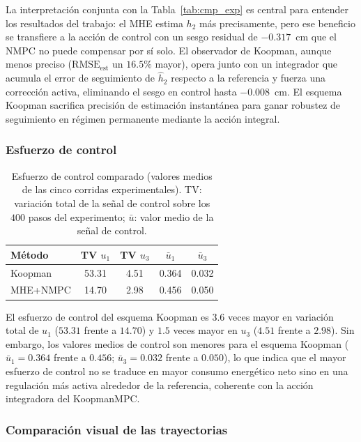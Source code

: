 \documentclass[12pt,letterpaper]{article}
\begin{document}
La interpretación conjunta con la Tabla~\ref{tab:cmp_exp} es
central para entender los resultados del trabajo: el MHE
estima $h_2$ más precisamente, pero ese beneficio se
transfiere a la acción de control con un sesgo residual de
$-0.317$~cm que el NMPC no puede compensar por sí solo. El
observador de Koopman, aunque menos preciso
($\mathrm{RMSE}_{\mathrm{est}}$ un $16.5\%$ mayor), opera
junto con un integrador que acumula el error de seguimiento
de $\hat{h}_2$ respecto a la referencia y fuerza una
corrección activa, eliminando el sesgo en control hasta
$-0.008$~cm. El esquema Koopman sacrifica precisión de
estimación instantánea para ganar robustez de seguimiento
en régimen permanente mediante la acción integral.

\subsubsection{Esfuerzo de control}
\label{sec:esfuerzo}

\begin{table}[H]
\centering
\caption{Esfuerzo de control comparado (valores medios de 
las cinco corridas experimentales). TV: variación total de 
la señal de control sobre los $400$ pasos del experimento; 
$\bar{u}$: valor medio de la señal de control.}
\label{tab:ctrl_effort}
\begin{tabular}{lcccc}
\toprule
\textbf{Método} & \textbf{TV $u_1$} & \textbf{TV $u_3$} & 
\textbf{$\bar{u}_1$} & \textbf{$\bar{u}_3$} \\
\midrule
Koopman  & 53.31 & 4.51 & 0.364 & 0.032 \\
MHE+NMPC & 14.70 & 2.98 & 0.456 & 0.050 \\
\bottomrule
\end{tabular}
\end{table}

El esfuerzo de control del esquema Koopman es $3.6$ veces 
mayor en variación total de $u_1$ ($53.31$ frente a $14.70$) 
y $1.5$ veces mayor en $u_3$ ($4.51$ frente a $2.98$). Sin 
embargo, los valores medios de control son menores para el 
esquema Koopman ($\bar{u}_1 = 0.364$ frente a $0.456$; 
$\bar{u}_3 = 0.032$ frente a $0.050$), lo que indica que el 
mayor esfuerzo de control no se traduce en mayor consumo 
energético neto sino en una regulación más activa alrededor 
de la referencia, coherente con la acción integradora del 
KoopmanMPC.

\subsubsection{Comparación visual de las trayectorias}
\label{sec:overlay}
\end{document}

